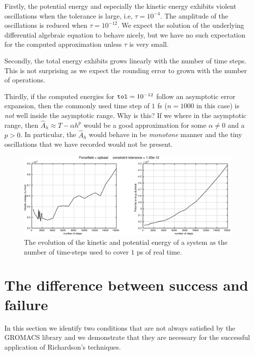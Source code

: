 \documentclass[runningheads]{llncs}
\begin{document}
Firstly, the potential energy and especially the kinetic energy exhibits violent oscillations when the tolerance is large, i.e, $\tau = 10^{-4}$. The amplitude of the oscillations is reduced when $\tau = 10^{-12}$. We expect the solution of the underlying differential algebraic equation to behave nicely, but we have no such expectation for the computed approximation unless $\tau$ is very small. 

Secondly, the total energy exhibits grows linearly with the number of time steps. This is not surprising as we expect the rounding error to grown with the number of operations.

Thirdly, if the computed energies for ${\tt tol} = 10 ^{-12}$ follow an asymptotic error expansion, then the commonly used time step of $1$ fs ($n=1000$ in this case) is \emph{not} well inside the asymptotic range. Why is this? If we where in the asymptotic range, then $\hat{A}_h \approx T - \alpha h^p$ would be a good approximation for some $\alpha \not = 0$ and a $p>0$. In particular, the $\hat{A}_h$  would behave in be \emph{monotone} manner and the tiny oscillations that we have recorded would not be present.

\begin{figure}
  \centering
  \includegraphics[width=\linewidth]{oplsaaltol12.pdf}
   \caption{The evolution of the kinetic and potential energy of a system as the number of time-steps used to cover $1$ ps of real time.} \label{fig:oplsaaltol12}
\end{figure}


\section{The difference between success and failure}

In this section we identify two conditions that are not always satisfied by the GROMACS library and we demonstrate that they are necessary for the successful application of Richardson's techniques.
\end{document}
